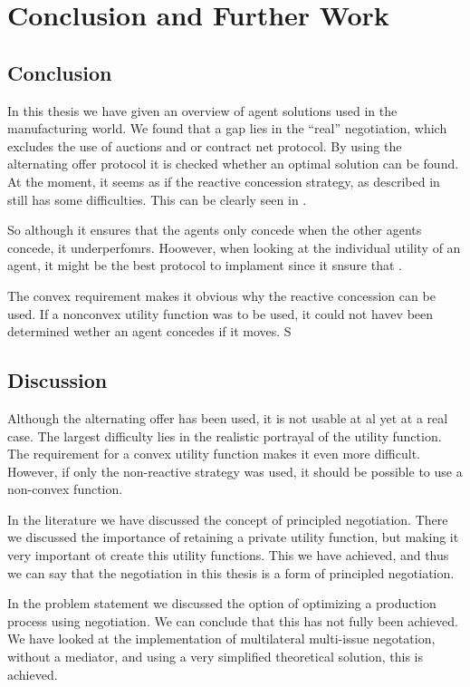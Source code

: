 \chapter{Conclusion and Further Work}
\section{Conclusion}
In this thesis we have given an overview of agent solutions used in the manufacturing world. We found that a gap lies in the ``real'' negotiation, which excludes the use of auctions and or contract net protocol. By using the alternating offer protocol it is checked whether an optimal solution can be found. At the moment, it seems as if the reactive concession strategy, as described in \citet{zheng2015automated} still has some difficulties. This can be clearly seen in . 

So although it ensures that the agents only concede when the other agents concede, it underperfomrs. Hoowever, when looking at the individual utility of an agent, it might be the best protocol to implament since it snsure that .

The convex requirement makes it obvious why the reactive concession can be used. If a nonconvex utility function was to be used, it could not havev been determined wether an agent concedes if it moves. S



\section{Discussion}
Although the alternating offer has been used, it is not usable at al yet at a real case. The largest difficulty lies in the realistic portrayal of the utility function. The requirement for a convex utility function makes it even more difficult. However, if only the non-reactive strategy was used, it should be possible to use a non-convex function.

In the literature we have discussed the concept of principled negotiation. There we discussed the importance of retaining a private utility function, but making it very important ot create this utility functions. This we have achieved, and thus we can say that the negotiation in this thesis is a form of principled negotiation.

In the problem statement we discussed the option of optimizing a production process using negotiation. We can conclude that this has not fully been achieved. We have looked at the implementation of multilateral multi-issue negotation, without a mediator, and using a very simplified theoretical solution, this is achieved. 


